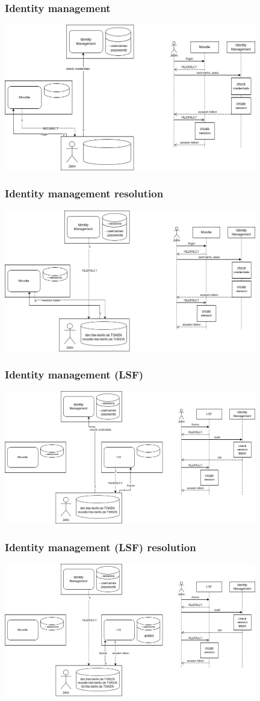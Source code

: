 \documentclass{beamer}
\begin{document}
\begin{frame}
  \frametitle{Identity management}
    \includegraphics[width=11cm]{idm}
\end{frame}

\begin{frame}
  \frametitle{Identity management resolution}
    \includegraphics[width=11cm]{idm resolution}
\end{frame}

\begin{frame}
  \frametitle{Identity management (LSF)}
    \includegraphics[width=11cm]{idm lsf}
\end{frame}

\begin{frame}
  \frametitle{Identity management (LSF) resolution}
    \includegraphics[width=11cm]{idm lsf resolution}
\end{frame}
\end{document}
